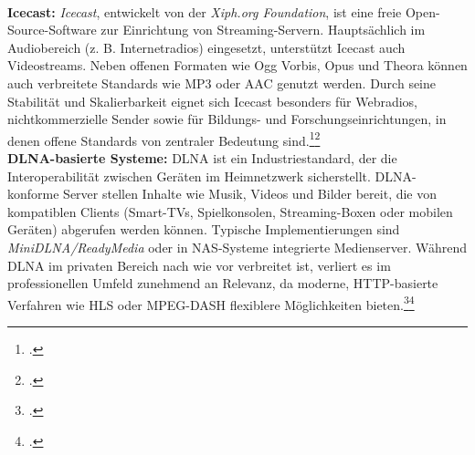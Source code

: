 \documentclass[12pt,a4paper]{report}
\begin{document}
  \\
  \newline
  \textbf{Icecast:}
  \emph{Icecast}, entwickelt von der \emph{Xiph.org Foundation}, ist eine freie Open-Source-Software zur Einrichtung von Streaming-Servern. 
  Hauptsächlich im Audiobereich (z. B. Internetradios) eingesetzt, unterstützt Icecast auch Videostreams. 
  Neben offenen Formaten wie Ogg Vorbis, Opus und Theora können auch verbreitete Standards wie \ac{MP3} oder \ac{AAC} genutzt werden. 
  Durch seine Stabilität und Skalierbarkeit eignet sich Icecast besonders für Webradios, nichtkommerzielle Sender sowie für Bildungs- und Forschungseinrichtungen, 
  in denen offene Standards von zentraler Bedeutung sind.\footcite[Vgl.][]{wikipedia_icecast}\footcite[Vgl.][]{icecast_docs}  
  \\
  \newline
  \textbf{DLNA-basierte Systeme:}
  \ac{DLNA} ist ein Industriestandard, der die Interoperabilität zwischen Geräten im Heimnetzwerk sicherstellt. 
  \ac{DLNA}-konforme Server stellen Inhalte wie Musik, Videos und Bilder bereit, die von kompatiblen Clients 
  (Smart-TVs, Spielkonsolen, Streaming-Boxen oder mobilen Geräten) abgerufen werden können. 
  Typische Implementierungen sind \emph{MiniDLNA/ReadyMedia} oder in \ac{NAS}-Systeme integrierte Medienserver. 
  Während \ac{DLNA} im privaten Bereich nach wie vor verbreitet ist, verliert es im professionellen Umfeld zunehmend an Relevanz, da moderne, \ac{HTTP}-basierte Verfahren wie \ac{HLS} oder \ac{MPEG-DASH} flexiblere Möglichkeiten bieten.\footcite[Vgl.][]{wikipedia_dlna}\footcite[Vgl.][]{dlna_specs}
\end{document}
